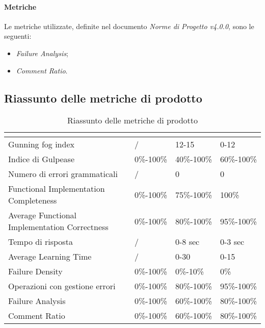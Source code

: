 \paragraph{Metriche} \Spazio
Le metriche utilizzate, definite nel documento \emph{Norme di Progetto v4.0.0}, sono le seguenti:
	\begin{itemize}
		\item{\emph{Failure Analysis};}
		\item{\emph{Comment Ratio}.}
	\end{itemize}

\subsection{Riassunto delle metriche di prodotto}
\renewcommand{\arraystretch}{1.5}
\begin{table}[H]
	\centering
	\begin{tabular}{|C{4cm}|C{3cm}|C{3cm}|C{3cm}|}
		\hline
		\textbf{\color{title_text}{Nome Metrica}} & \textbf{\color{title_text}{Intervallo limite}} & \textbf{\color{title_text}{Range accettabile}} & \textbf{\color{title_text}{Range ottimale}} \\ \hline
		Gunning fog index & / &12-15&0-12 \\ \hline
		Indice di Gulpease & 0\%-100\%& 40\%-100\%& 60\%-100\% \\ \hline
		Numero di errori grammaticali & / & 0 & 0 \\ \hline
		Functional Implementation Completeness & 0\%-100\% & 75\%-100\% & 100\% \\ \hline
		Average Functional Implementation Correctness&0\%-100\%&80\%-100\%&95\%-100\% \\ \hline
		Tempo di risposta & / &0-8 sec & 0-3 sec \\ \hline
		Average Learning Time& / & 0-30 & 0-15 \\ \hline
		Failure Density&0\%-100\%&0\%-10\%&0\% \\ \hline
		Operazioni con gestione errori &0\%-100\%&80\%-100\%&95\%-100\% \\ \hline
		Failure Analysis&0\%-100\%&60\%-100\%&80\%-100\% \\ \hline
		Comment Ratio&0\%-100\%&60\%-100\%&80\%-100\%\\ \hline
	\end{tabular}
	\caption{Riassunto delle metriche di prodotto}
	\label{tabella:riassunto metriche di prodotto}
\end{table}
\renewcommand{\arraystretch}{1}
